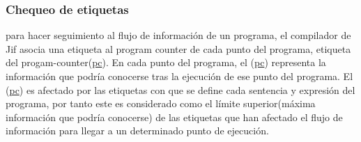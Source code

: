 \subsubsection{Chequeo de etiquetas}
para hacer seguimiento al flujo de información de un programa, el compilador de
Jif asocia una etiqueta al program counter de cada punto del programa,
etiqueta del progam-counter(\underline{pc}). En cada punto del programa, el
(\underline{pc}) representa la información que podría conocerse tras la
ejecución de ese punto del programa.
El (\underline{pc}) es afectado por las etiquetas con que se define cada
sentencia y expresión del programa, por tanto este es considerado como el límite
superior(máxima información que podría conocerse) de las etiquetas que han
afectado el flujo de información para llegar a un determinado punto de
ejecución.

